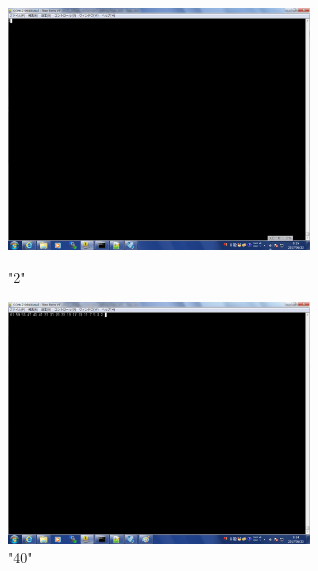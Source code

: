 \documentclass{jsarticle}
\begin{document}
\begin{figure}[htbp]
 \begin{minipage}{0.5\hsize}
  \begin{center}
  \includegraphics[width=8cm,bb=0 0 1280 1024]{2out.png}
  \end{center}
  \caption{"2"}
 \end{minipage}
 \begin{minipage}{0.5\hsize}
  \begin{center}
   \includegraphics[width=8cm,bb=0 0 1280 1024]{40out.png}
  \end{center}
  \caption{"40"}
 \end{minipage}
\end{figure}
\end{document}
